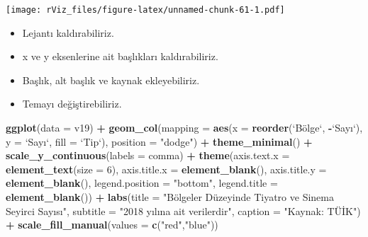 \documentclass[
]{book}
\newenvironment{Shaded}{\begin{snugshade}}{\end{snugshade}}
\newcommand{\DataTypeTok}[1]{\textcolor[rgb]{0.13,0.29,0.53}{#1}}
\newcommand{\DecValTok}[1]{\textcolor[rgb]{0.00,0.00,0.81}{#1}}
\newcommand{\KeywordTok}[1]{\textcolor[rgb]{0.13,0.29,0.53}{\textbf{#1}}}
\newcommand{\NormalTok}[1]{#1}
\newcommand{\OperatorTok}[1]{\textcolor[rgb]{0.81,0.36,0.00}{\textbf{#1}}}
\newcommand{\StringTok}[1]{\textcolor[rgb]{0.31,0.60,0.02}{#1}}
\begin{document}
\texttt{[image: rViz\_files/figure-latex/unnamed-chunk-61-1.pdf]}

\begin{itemize}
\item
  Lejantı kaldırabiliriz.
\item
  x ve y eksenlerine ait başlıkları kaldırabiliriz.
\item
  Başlık, alt başlık ve kaynak ekleyebiliriz.
\item
  Temayı değiştirebiliriz.
\end{itemize}

\begin{Shaded}
\begin{Highlighting}[]
\KeywordTok{ggplot}\NormalTok{(}\DataTypeTok{data =}\NormalTok{ v19) }\OperatorTok{+}
\StringTok{  }\KeywordTok{geom_col}\NormalTok{(}\DataTypeTok{mapping =} \KeywordTok{aes}\NormalTok{(}\DataTypeTok{x =} \KeywordTok{reorder}\NormalTok{(}\StringTok{`}\DataTypeTok{Bölge}\StringTok{`}\NormalTok{, }\OperatorTok{-}\StringTok{`}\DataTypeTok{Sayı}\StringTok{`}\NormalTok{), }\DataTypeTok{y =} \StringTok{`}\DataTypeTok{Sayı}\StringTok{`}\NormalTok{, }\DataTypeTok{fill =} \StringTok{`}\DataTypeTok{Tip}\StringTok{`}\NormalTok{), }\DataTypeTok{position =} \StringTok{"dodge"}\NormalTok{) }\OperatorTok{+}
\StringTok{  }\KeywordTok{theme_minimal}\NormalTok{() }\OperatorTok{+}
\StringTok{  }\KeywordTok{scale_y_continuous}\NormalTok{(}\DataTypeTok{labels =}\NormalTok{ comma) }\OperatorTok{+}
\StringTok{  }\KeywordTok{theme}\NormalTok{(}\DataTypeTok{axis.text.x =} \KeywordTok{element_text}\NormalTok{(}\DataTypeTok{size =} \DecValTok{6}\NormalTok{),}
        \DataTypeTok{axis.title.x =} \KeywordTok{element_blank}\NormalTok{(),}
        \DataTypeTok{axis.title.y =} \KeywordTok{element_blank}\NormalTok{(),}
        \DataTypeTok{legend.position =} \StringTok{"bottom"}\NormalTok{,}
        \DataTypeTok{legend.title =} \KeywordTok{element_blank}\NormalTok{()) }\OperatorTok{+}
\StringTok{  }\KeywordTok{labs}\NormalTok{(}\DataTypeTok{title =} \StringTok{"Bölgeler Düzeyinde Tiyatro ve Sinema Seyirci Sayısı"}\NormalTok{,}
       \DataTypeTok{subtitle =} \StringTok{"2018 yılına ait verilerdir"}\NormalTok{,}
       \DataTypeTok{caption =} \StringTok{"Kaynak: TÜİK"}\NormalTok{) }\OperatorTok{+}
\StringTok{  }\KeywordTok{scale_fill_manual}\NormalTok{(}\DataTypeTok{values =} \KeywordTok{c}\NormalTok{(}\StringTok{"red"}\NormalTok{,}\StringTok{"blue"}\NormalTok{))}
\end{Highlighting}
\end{Shaded}
\end{document}
